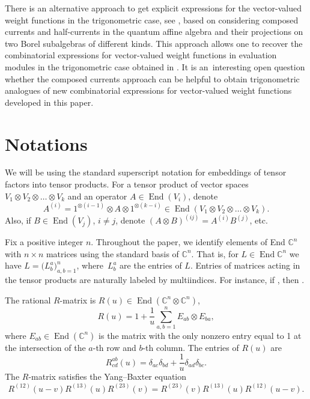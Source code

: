 \documentclass[10pt,a4paper]{amsart}
\numberwithin{equation}{section}
\DeclareMathOperator{\End}{End}
\begin{document}
There is an alternative approach to get explicit expressions for the vector-valued weight
functions in the trigonometric case, see \cite{KP,KPT, OPS}, based on considering composed
currents and half-currents in the quantum affine algebra and their projections on two Borel
subalgebras of different kinds. This approach allows one to recover the combinatorial expressions
for vector-valued weight functions in evaluation modules in the trigonometric case obtained
in \cite{TVC}. It is an~interesting open question whether the composed currents approach
can be helpful to obtain trigonometric analogues of new combinatorial expressions for
vector-valued weight functions developed in this paper.

\section{Notations}\label{notation}
We will be using the standard superscript notation for embeddings of tensor factors into tensor products. For a tensor product of vector spaces $V_1\otimes V_2\otimes\dots\otimes V_k$ and an operator $A\in \End (V_i)$, denote
\begin{equation*}
A^{(i)}=1^{\otimes(i-1)} \otimes A \otimes 1^{\otimes(k-i)} \in \End(V_1\otimes V_2\otimes\dots\otimes V_k). \end{equation*}
Also, if $B\in \End (V_j)$, $i\neq j$, denote $(A\otimes B)^{(ij)}=A^{(i)}B^{(j)}$, etc.

Fix a positive integer $n$. Throughout the paper, we identify elements of End $\mathbb{C}^n$ with $n\times n$ matrices using the standard basis of $\mathbb{C}^n$. That is, for $L\in \End \mathbb{C}^n$ we have $ L= \bigl( L_b^a \bigr)_{a,b=1}^n$, where~$L_b^a$ are the entries of $L$. Entries of matrices acting in the tensor products  are naturally labeled by multiindices. For instance, if \smash{$M\in \End(\mathbb{C}^n\otimes \mathbb{C}^n)$}, then .

The rational $R$-matrix is $R(u)\in \End (\mathbb{C}^n\otimes \mathbb{C}^n)$,
\begin{equation}\label{rmatrix}
R(u)=1+\frac{1}{u}\sum_{a, b=1}^{n} E_{a b} \otimes E_{b a},
\end{equation}
where $ E_{a b} \in \End\left(\mathbb{C}^{n}\right) $ is the matrix with the only nonzero entry equal to 1 at the intersection of the $a$-th row and $b$-th column. The entries of $R(u)$ are
\begin{equation*}
R^{ab}_{cd}(u)= \delta_{ac}\delta_{bd} +\frac{1}{u}\delta_{ad}\delta_{bc}.
\end{equation*}
The $R$-matrix satisfies the Yang--Baxter equation
\begin{equation}\label{YB} R^{(12)}(u-v) R^{(13)}(u) R^{(23)}(v)=R^{(23)}(v) R^{(13)}(u) R^{(12)}(u-v).\end{equation}
\end{document}
